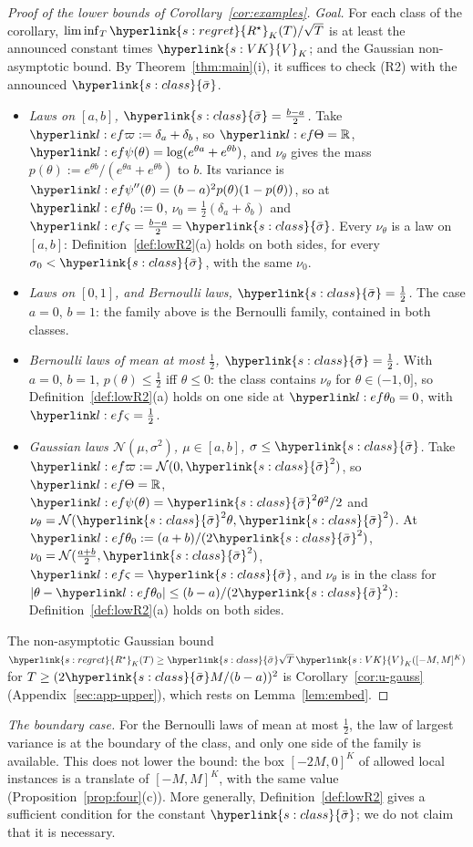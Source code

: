 \documentclass[11pt]{article}
\DeclareRobustCommand{\sy}[2]{{\hyperlink{#1}{#2}}}
\newcommand{\R}{\mathbb{R}}
\newcommand{\1}{\mathbf{1}}
\newcommand{\Rs}{\sy{s:regret}{R^\star}}
\newcommand{\sbar}{\sy{s:class}{\bar\sigma}}
\newcommand{\VK}{\sy{s:VK}{V}}
\begin{document}
\begin{proof}[Proof of the lower bounds of Corollary~\ref{cor:examples}]
\textit{Goal.} For each class of the corollary, $\liminf_T\Rs_K(T)/\sqrt T$ is at least the announced constant times $\VK_K$; and the Gaussian non-asymptotic bound.
By Theorem~\ref{thm:main}(i), it suffices to check (R2) with the announced $\sbar$.
\begin{itemize}
\item \emph{Laws on $[a,b]$, $\sbar=\frac{b-a}2$.} Take $\lvp:=\delta_a+\delta_b$, so $\lTh=\R$, $\lpsi(\theta)=\log(e^{\theta a}+e^{\theta b})$, and $\nu_\theta$ gives the mass
$p(\theta):=e^{\theta b}/(e^{\theta a}+e^{\theta b})$ to $b$. Its variance is $\lpsi''(\theta)=(b-a)^2p(\theta)(1-p(\theta))$, so at $\lthz:=0$, $\nu_0=\frac12(\delta_a+\delta_b)$ and
$\lsd=\frac{b-a}2=\sbar$. Every $\nu_\theta$ is a law on $[a,b]$: Definition~\ref{def:lowR2}(a) holds on both sides, for every $\sigma_0<\sbar$, with the same $\nu_0$.
\item \emph{Laws on $[0,1]$, and Bernoulli laws, $\sbar=\frac12$.} The case $a=0$, $b=1$: the family above is the Bernoulli family, contained in both classes.
\item \emph{Bernoulli laws of mean at most $\frac12$, $\sbar=\frac12$.} With $a=0$, $b=1$, $p(\theta)\le\frac12$ iff $\theta\le0$: the class contains $\nu_\theta$ for
$\theta\in(-1,0]$, so Definition~\ref{def:lowR2}(a) holds on one side at $\lthz=0$, with $\lsd=\frac12$.
\item \emph{Gaussian laws $\mathcal N(\mu,\sigma^2)$, $\mu\in[a,b]$, $\sigma\le\sbar$.} Take $\lvp:=\mathcal N(0,\sbar^2)$, so $\lTh=\R$, $\lpsi(\theta)=\sbar^2\theta^2/2$ and
$\nu_\theta=\mathcal N(\sbar^2\theta,\sbar^2)$. At $\lthz:=(a+b)/(2\sbar^2)$, $\nu_0=\mathcal N(\frac{a+b}2,\sbar^2)$, $\lsd=\sbar$, and $\nu_\theta$ is in the class for
$|\theta-\lthz|\le(b-a)/(2\sbar^2)$: Definition~\ref{def:lowR2}(a) holds on both sides.
\end{itemize}
The non-asymptotic Gaussian bound $\Rs_K(T)\ge\sbar\sqrt T\,\VK_K([-M,M]^K)$ for $T\ge(2\sbar M/(b-a))^2$ is Corollary~\ref{cor:u-gauss} (Appendix~\ref{sec:app-upper}),
which rests on Lemma~\ref{lem:embed}.
\end{proof}

\noindent\emph{The boundary case.} For the Bernoulli laws of mean at most $\frac12$, the law of largest variance is at the boundary of the class, and only one side of the
family is available. This does not lower the bound: the box $[-2M,0]^K$ of allowed local instances is a translate of $[-M,M]^K$, with the same value
(Proposition~\ref{prop:four}(c)). More generally, Definition~\ref{def:lowR2} gives a sufficient condition for the constant $\sbar$; we do not claim that it is necessary.
\end{document}
